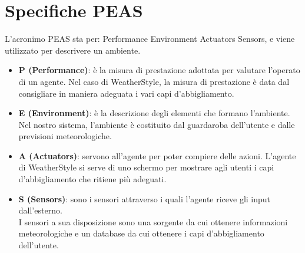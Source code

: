 \documentclass[a4paper, 11pt, oneside]{report}
\begin{document}
            \section{Specifiche PEAS}
            L'acronimo PEAS sta per: Performance Environment Actuators Sensors, e viene utilizzato per descrivere un ambiente.
            \begin{itemize}
                \item \textbf{P (Performance)}: è la misura di prestazione adottata per valutare l'operato di un agente.
                Nel caso di WeatherStyle, la misura di prestazione è data dal consigliare in maniera adeguata i vari capi
                d'abbigliamento.
                \item \textbf{E (Environment)}: è la descrizione degli elementi che formano l'ambiente.\\
                Nel nostro
                sistema, l'ambiente è costituito dal guardaroba dell'utente e dalle previsioni meteorologiche.
                \item \textbf{A (Actuators)}: servono all'agente per poter compiere delle azioni. L'agente di WeatherStyle
                si serve di uno schermo per mostrare agli utenti i capi d'abbigliamento che ritiene più adeguati.
                \item \textbf{S (Sensors)}: sono i sensori attraverso i quali l'agente riceve gli input dall'esterno.
                \\ I sensori a sua disposizione sono una sorgente da cui ottenere informazioni meteorologiche
                    e un database da cui ottenere i capi d'abbigliamento dell'utente.
            \end{itemize}
\end{document}
